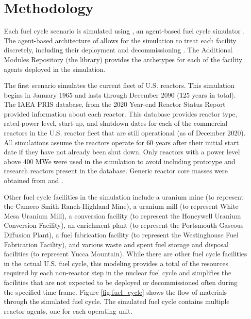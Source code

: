 \section{Methodology}

Each fuel cycle scenario is simulated using \Cyclus, an 
agent-based fuel cycle simulator \cite{huff_fundamental_2016}. 
The agent-based architecture of \Cyclus allows for the simulation to treat
each facility discretely, including their deployment and 
decommissioning \cite{huff_fundamental_2016}. The \Cyclus 
Additional Modules Repository (the \Cycamore library) provides 
the archetypes for each of the facility agents deployed in the simulation.

The first scenario simulates the current fleet of U.S. reactors. This 
simulation begins in January 1965 and lasts through December 2090 (125 
years in total). The \gls{IAEA} \gls{PRIS} database\cite{noauthor_power_1989},
from the 2020 
Year-end Reactor Status Report provided information about each reactor.
This database provides reactor type, rated power level, start-up, and 
shutdown dates for each of the commercial reactors in the U.S. reactor 
fleet
that are still operational (as of December 2020). All simulations assume 
the reactors operate for 60 years after their
initial start date if they have not already been shut down. Only reactors
with a power level above 400 MWe were 
used in the simulation to avoid including prototype and research reactors 
present in the database. Generic reactor core masses were obtained from 
\cite{todreas_nuclear_2012} and \cite{cacuci_handbook_2010}. 

Other fuel cycle facilities in the simulation include a uranium mine (to 
represent the Cameco Smith Ranch-Highland Mine), a uranium mill (to 
represent White Mesa Uranium Mill), a conversion facility (to represent 
the Honeywell Uranium Conversion Facility), an enrichment plant (to represent 
the Portsmouth Gaseous Diffusion Plant), a fuel fabrication facility (to 
represent the Westinghouse Fuel Fabrication Facility), and various waste and 
spent fuel storage and disposal facilities (to represent Yucca Mountain). 
While there
are other fuel cycle facilities in the actual U.S. fuel cycle, this 
modeling provides a total of the resources required 
by each non-reactor step in the nuclear fuel cycle and simplifies the 
facilities that are not expected to be deployed or decommissioned often 
during the specified time frame. Figure \ref{fig:fuel_cycle} shows 
the flow of materials through the simulated fuel cycle. The simulated fuel 
cycle contains multiple reactor agents, one for each operating unit.


